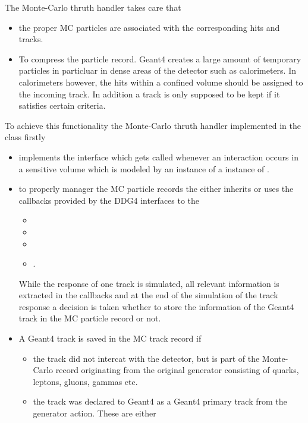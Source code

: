 \noindent
The Monte-Carlo thruth handler takes care that 
\begin{itemize}
\item the proper MC particles are associated with the corresponding hits
      and tracks.
\item To compress the particle record. Geant4 creates a large amount 
      of temporary particles in particluar in dense areas of the 
      detector such as calorimeters. In calorimeters however, the 
      hits within a confined volume should be assigned to the incoming
      track. In addition a track is only supposed to be kept if it 
      satisfies certain criteria.
\end{itemize}
To achieve this functionality the Monte-Carlo thruth handler implemented
in the class  firstly
\begin{itemize}
\item implements the interface  which gets
      called whenever an interaction occurs in a sensitive volume
      which is modeled by an instance of a instance of 
      .
\item to properly manager the MC particle records the 			
	   either inherits or uses
	  the callbacks provided by the DDG4 interfaces to the
	  \begin{itemize}
		  \item {}
		  \item {}
		  \item {}
		  \item {}.
	  \end{itemize}
	  While the response of one track is simulated, all relevant 
	  information is extracted in the callbacks and at the end of the
	  simulation of the track response a decision is taken whether to
	  store the information of the Geant4 track in the MC particle
	  record or not.
\item A Geant4 track is saved in the MC track record if
	  \begin{itemize}
	  	  \item the track did not intercat with the detector, but 
	  	  		is part of the Monte-Carlo record originating
	  	  		from the original generator consisting of quarks,
	  	  		leptons, gluons, gammas etc.
		  \item the track was declared to Geant4 as a Geant4 primary
		        track from the generator action. These are either 

\end{itemize}
\end{itemize}
